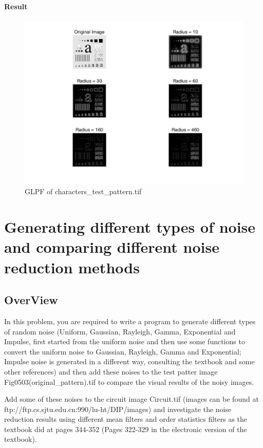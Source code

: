 \documentclass[11pt,oneside]{book}
\begin{document}
\subsubsection{Result}
\begin{figure}[!htb]
   \centering  
   \includegraphics[width=1.0\textwidth]{images/3/GHPF.jpg}
   \caption{GLPF of characters\_test\_pattern.tif}  
\end{figure}




\chapter{Generating different types of noise and comparing different noise reduction methods}
\section{OverView}
In this problem, you are required to write a program to generate different types of random noise (Uniform, Gaussian, Rayleigh, Gamma, Exponential and Impulse, first started from the uniform noise and then use some functions to convert the uniform noise to Gaussian, Rayleigh, Gamma and Exponential; Impulse noise is generated in a different way, consulting the textbook and some other references) and then add these noises to the test patter image Fig0503(original\_pattern).tif to compare the visual results of the noisy images.

Add some of these noises to the circuit image Circuit.tif (images can be found at ftp://ftp.cs.sjtu.edu.cn:990/lu-ht/DIP/images) and investigate the noise reduction results using different mean filters and order statistics filters as the textbook did at pages 344-352 (Pages 322-329 in the electronic version of the textbook).
\end{document}
